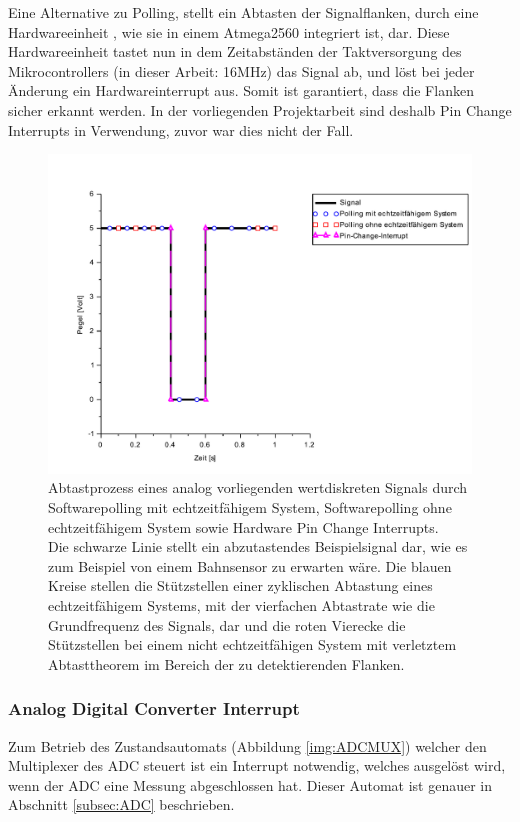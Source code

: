 \documentclass[a4paper, 11pt]{report}
\begin{document}
					Eine Alternative zu Polling, stellt ein Abtasten der Signalflanken, durch eine Hardwareeinheit , wie sie in einem Atmega2560 integriert ist, dar.
					Diese Hardwareeinheit tastet nun in dem Zeitabständen der Taktversorgung des Mikrocontrollers (in dieser Arbeit: 16MHz) das Signal ab, 
					und löst bei jeder Änderung ein Hardwareinterrupt aus. Somit ist garantiert, dass die Flanken sicher erkannt werden. 
					In der vorliegenden Projektarbeit sind deshalb Pin Change Interrupts in Verwendung, zuvor war dies nicht der Fall.  
				\begin{figure}[ht]
					\centering
					\includegraphics[width=\textwidth]{rec/rtPolling.pdf}
					\caption[Abtastung eines digitalen Signals]{Abtastprozess eines analog vorliegenden wertdiskreten Signals durch Softwarepolling mit echtzeitfähigem System, 
 					Softwarepolling ohne echtzeitfähigem System sowie Hardware Pin Change Interrupts.\\
					Die schwarze Linie stellt ein abzutastendes Beispielsignal dar, wie es zum Beispiel von einem Bahnsensor zu erwarten wäre.
					Die blauen Kreise stellen die Stützstellen einer zyklischen Abtastung eines echtzeitfähigem Systems, 
					mit der vierfachen Abtastrate wie die Grundfrequenz des Signals, 
					dar und die roten Vierecke die Stützstellen bei einem nicht echtzeitfähigen System mit verletztem Abtasttheorem im Bereich der zu detektierenden Flanken.
					 }
				\label{fig:rtPolling}
				\end{figure}
\FloatBarrier
			\subsubsection{Analog Digital Converter Interrupt}\label{subsubsec:ADCINT}
			Zum Betrieb des Zustandsautomats (Abbildung \ref{img:ADCMUX}) welcher den Multiplexer des ADC steuert ist ein Interrupt notwendig, welches ausgelöst wird, wenn der ADC eine Messung abgeschlossen hat. Dieser Automat ist genauer in Abschnitt \ref{subsec:ADC} beschrieben.
\end{document}
